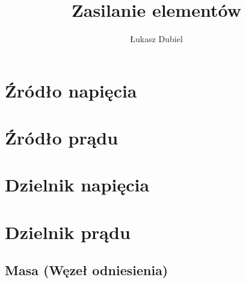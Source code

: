 \documentclass[11pt]{article}
\author{Łukasz Dubiel}
\title{Zasilanie elementów}
\begin{document}
\maketitle

\section{Źródło napięcia}


\section{Źródło prądu}

\section{Dzielnik napięcia}

\section{Dzielnik prądu}

\subsection{Masa (Węzeł odniesienia)}
\end{document}
